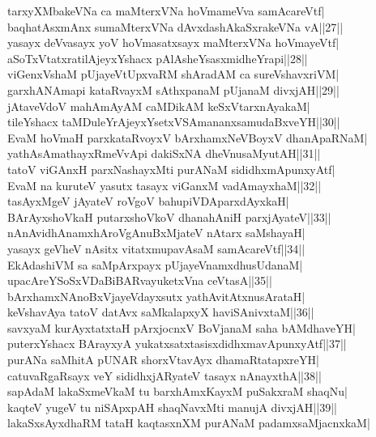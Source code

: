 \documentclass{article}
\begin{document}
tarxyXMbakeVNa ca maMterxVNa hoVmameVva samAcareVtf|\\
baqhatAsxmAnx sumaMterxVNa dAvxdashAkaSxrakeVNa vA||27||\\
yasayx deVvasayx yoV hoVmasatxsayx maMterxVNa hoVmayeVtf|\\
aSoTxVtatxratilAjeyxYshacx pAlAsheYsasxmidheYrapi||28||\\
viGenxVshaM pUjayeVtUpxvaRM shAradAM ca sureVshavxriVM|\\
garxhANAmapi kataRvayxM sAthxpanaM pUjanaM divxjAH||29||\\
jAtaveVdoV mahAmAyAM caMDikAM keSxVtarxnAyakaM|\\
tileYshacx taMDuleYrAjeyxYsetxVSAmananxsamudaBxveYH||30||\\
EvaM hoVmaH parxkataRvoyxV bArxhamxNeVBoyxV dhanApaRNaM|\\
yathAsAmathayxRmeVvApi dakiSxNA dheVnusaMyutAH||31||\\
tatoV viGAnxH parxNashayxMti purANaM sididhxmApunxyAtf|\\
EvaM na kuruteV yasutx tasayx viGanxM vadAmayxhaM||32||\\
tasAyxMgeV jAyateV roVgoV bahupiVDAparxdAyxkaH|\\
BArAyxshoVkaH putarxshoVkoV dhanahAniH parxjAyateV||33||\\
nAnAvidhAnamxhAroVgAnuBxMjateV nAtarx saMshayaH|\\
yasayx geVheV nAsitx vitatxmupavAsaM samAcareVtf||34||\\
EkAdashiVM sa saMpArxpayx pUjayeVnamxdhusUdanaM|\\
upacAreYSoSxVDaBiBARvayuketxVna ceVtasA||35||\\
bArxhamxNAnoBxVjayeVdayxsutx yathAvitAtxnusArataH|\\
keVshavAya tatoV datAvx saMkalapxyX haviSAnivxtaM||36||\\
savxyaM kurAyxtatxtaH pArxjocnxV BoVjanaM saha bAMdhaveYH|\\
puterxYshacx BArayxyA yukatxsatxtasisxdidhxmavApunxyAtf||37||\\
purANa saMhitA pUNAR shorxVtavAyx dhamaRtatapxreYH|\\
catuvaRgaRsayx veY sididhxjARyateV tasayx nAnayxthA||38||\\
sapAdaM lakaSxmeVkaM tu barxhAmxKayxM puSakxraM shaqNu|\\
kaqteV yugeV tu niSApxpAH shaqNavxMti manujA divxjAH||39||\\
lakaSxsAyxdhaRM tataH kaqtasxnXM purANaM padamxsaMjacnxkaM|\\
\end{document}
